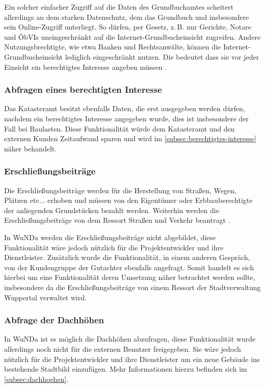 Ein solcher einfacher Zugriff auf die Daten des Grundbuchamtes scheitert allerdings an dem starken Datenschutz, dem das Grundbuch und insbesondere sein Online-Zugriff unterliegt.
So dürfen, per Gesetz, z.\,B. nur Gerichte, Notare und \acp{ÖbVI} uneingeschränkt auf die Internet-Grundbucheinsicht zugreifen.
Andere Nutzungsbrechtigte, wie etwa Banken und Rechtsanwälte, können die Internet-Grundbucheinsicht lediglich eingeschränkt nutzen.
Die bedeutet dass sie vor jeder Einsicht ein berechtigtes Interesse angeben müssen \autocite[vgl.][]{justiz-grundbucheinsicht}.

 
\subsubsection{Abfragen eines berechtigten Interesse}
Das Katasteramt besitzt ebenfalls Daten, die erst ausgegeben werden dürfen, nachdem ein berechtigtes Interesse angegeben wurde, dies ist insbesondere der Fall bei Baulasten.
Diese Funktionalität würde dem Katasteramt und den externen Kunden Zeitaufwand sparen und wird im \autoref{subsec:berechtigtes-interesse} näher behandelt.

\subsubsection{Erschließungsbeiträge}
Die Erschließungsbeiträge werden für die Herstellung von Straßen, Wegen, Plätzen etc... erhoben und müssen von den Eigentümer oder Erbbauberechtigte der anliegenden Grundstücken bezahlt werden.
Weiterhin werden die Erschließungsbeiträge von dem Ressort Straßen und Verkehr beantragt \autocite[vgl.][]{wupp-erschliessungsbeitrag}.

In \ac{WuNDa} werden die Erschließungsbeiträge nicht abgebildet, diese Funktionalität wäre jedoch nützlich für die Projektentwickler und ihre Dienstleister.
Zusätzlich wurde die Funktionalität, in einem anderen Gespräch, von der Kundengruppe der Gutachter ebenfalls angefragt.
Somit handelt es sich hierbei um eine Funktionalität deren Umsetzung näher betrachtet werden sollte, insbesondere da die Erschließungsbeiträge von einem Ressort der Stadtverwaltung Wuppertal verwaltet wird.

\subsubsection{Abfrage der Dachhöhen}
In \ac{WuNDa} ist es möglich die Dachhöhen abzufragen, diese Funktionalität wurde allerdings noch nicht für die externen Benutzer freigegeben.
Sie wäre jedoch nützlich für die Projektentwickler und ihre Dienstleister um ein neue Gebäude ins bestehende Stadtbild einzufügen.
Mehr Informationen hierzu befinden sich im \autoref{subsec:dachhoehen}.

